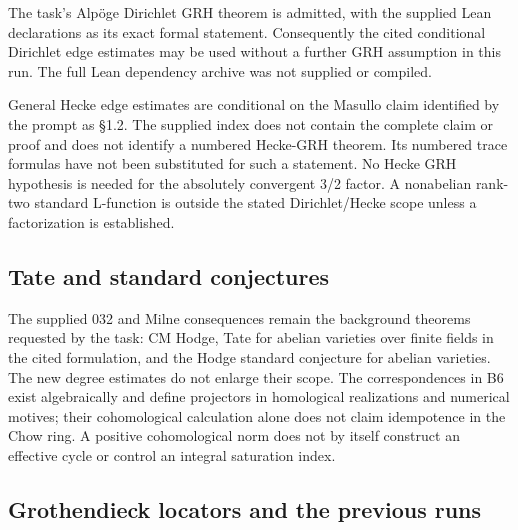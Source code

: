 \documentclass[11pt,a4paper]{article}
\theoremstyle{definition}
\begin{document}
The task's Alpöge Dirichlet GRH theorem is admitted, with the supplied
Lean declarations as its exact formal statement. Consequently the cited
conditional Dirichlet edge estimates may be used without a further GRH
assumption in this run. The full Lean dependency archive was not
supplied or compiled.

General Hecke edge estimates are conditional on the Masullo claim
identified by the prompt as §1.2. The supplied index does not contain
the complete claim or proof and does not identify a numbered Hecke-GRH
theorem. Its numbered trace formulas have not been substituted for such
a statement. No Hecke GRH hypothesis is needed for the absolutely
convergent 3/2 factor. A nonabelian rank-two standard L-function is
outside the stated Dirichlet/Hecke scope unless a factorization is
established.

\subsection{Tate and standard
conjectures}\label{tate-and-standard-conjectures}

The supplied 032 and Milne consequences remain the background theorems
requested by the task: CM Hodge, Tate for abelian varieties over finite
fields in the cited formulation, and the Hodge standard conjecture for
abelian varieties. The new degree estimates do not enlarge their scope.
The correspondences in B6 exist algebraically and define projectors in
homological realizations and numerical motives; their cohomological
calculation alone does not claim idempotence in the Chow ring. A
positive cohomological norm does not by itself construct an effective
cycle or control an integral saturation index.

\subsection{Grothendieck locators and the previous
runs}\label{grothendieck-locators-and-the-previous-runs}
\end{document}
